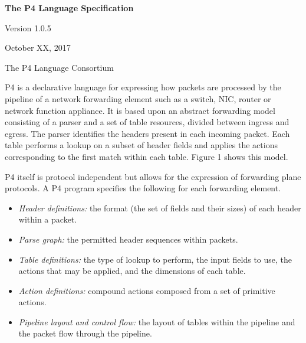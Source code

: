 \documentclass[12pt]{article}
\begin{document}
\vspace{2cm}

\centerline{\sffamily\bfseries\huge The P4 Language Specification}
\vspace{3mm}
\centerline{\sffamily\Large Version 1.0.5}
\vspace{3mm}
\centerline{\sffamily\large October XX, 2017}
\vspace{8mm}
\centerline{\sffamily\large The P4 Language Consortium}

\date{May 24, 2017}
\thispagestyle{firstpagestyle}


P4 is a declarative language for expressing how packets are processed by the
pipeline of a network forwarding element such as a switch, NIC, router or
network function appliance. It is based upon an abstract forwarding model
consisting of a parser and a set of \matchaction table resources, divided
between ingress and egress. The parser identifies the headers present in
each incoming packet. Each \matchaction table performs a lookup on a subset
of header fields and applies the actions corresponding to the first match
within each table. Figure 1 shows this model.

P4 itself is protocol independent but allows for the expression of forwarding
plane protocols. A P4 program specifies the following for each forwarding
element.

\begin{itemize}
\item
\textit{Header definitions:} the format (the set of fields and their
sizes) of each header within a packet.
\item
\textit{Parse graph:} the permitted header sequences within packets.
\item
\textit{Table definitions:} the type of lookup to perform, the input
fields to use, the actions that may be applied, and the dimensions of
each table.
\item
\textit{Action definitions:} compound actions composed from a set of
primitive actions.
\item
\textit{Pipeline layout and control flow:} the layout of tables within
the pipeline and the packet flow through the pipeline.
\end{itemize}
\end{document}
